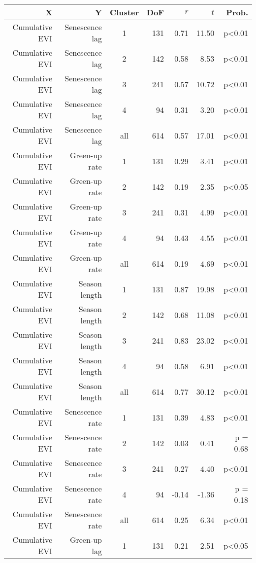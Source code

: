 \begin{table}[H]
\centering
\begin{tabular}{rrcrrrr}
  \hline
X & Y & Cluster & DoF & $r$ & $t$ & Prob. \\ 
  \hline
Cumulative EVI & Senescence lag & 1 & 131 & 0.71 & 11.50 & p<0.01 \\ 
  Cumulative EVI & Senescence lag & 2 & 142 & 0.58 & 8.53 & p<0.01 \\ 
  Cumulative EVI & Senescence lag & 3 & 241 & 0.57 & 10.72 & p<0.01 \\ 
  Cumulative EVI & Senescence lag & 4 &  94 & 0.31 & 3.20 & p<0.01 \\ 
  Cumulative EVI & Senescence lag & all & 614 & 0.57 & 17.01 & p<0.01 \\ 
   \hline
Cumulative EVI & Green-up rate & 1 & 131 & 0.29 & 3.41 & p<0.01 \\ 
  Cumulative EVI & Green-up rate & 2 & 142 & 0.19 & 2.35 & p<0.05 \\ 
  Cumulative EVI & Green-up rate & 3 & 241 & 0.31 & 4.99 & p<0.01 \\ 
  Cumulative EVI & Green-up rate & 4 &  94 & 0.43 & 4.55 & p<0.01 \\ 
  Cumulative EVI & Green-up rate & all & 614 & 0.19 & 4.69 & p<0.01 \\ 
   \hline
Cumulative EVI & Season length & 1 & 131 & 0.87 & 19.98 & p<0.01 \\ 
  Cumulative EVI & Season length & 2 & 142 & 0.68 & 11.08 & p<0.01 \\ 
  Cumulative EVI & Season length & 3 & 241 & 0.83 & 23.02 & p<0.01 \\ 
  Cumulative EVI & Season length & 4 &  94 & 0.58 & 6.91 & p<0.01 \\ 
  Cumulative EVI & Season length & all & 614 & 0.77 & 30.12 & p<0.01 \\ 
   \hline
Cumulative EVI & Senescence rate & 1 & 131 & 0.39 & 4.83 & p<0.01 \\ 
  Cumulative EVI & Senescence rate & 2 & 142 & 0.03 & 0.41 & p = 0.68 \\ 
  Cumulative EVI & Senescence rate & 3 & 241 & 0.27 & 4.40 & p<0.01 \\ 
  Cumulative EVI & Senescence rate & 4 &  94 & -0.14 & -1.36 & p = 0.18 \\ 
  Cumulative EVI & Senescence rate & all & 614 & 0.25 & 6.34 & p<0.01 \\ 
   \hline
Cumulative EVI & Green-up lag & 1 & 131 & 0.21 & 2.51 & p<0.05 \\ 

\end{tabular}
\end{table}
